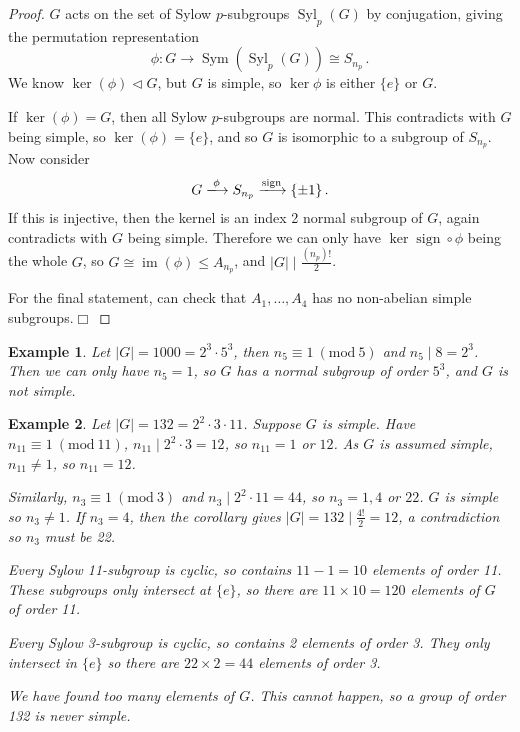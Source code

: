 \documentclass{article}
\theoremstyle{plain}\theoremheaderfont{\normalfont\itshape}\theorembodyfont{\rmfamily}\theoremseparator{.}\newtheorem*{rem}{Remark}\newtheorem*{ex}{Example}\newtheorem*{proof}{Proof}\newtheorem*{altp}{Alternative proof}\newtheorem*{nonex}{Non-Example}
\theoremstyle{plain}\theoremheaderfont{\normalfont\bfseries}\theorembodyfont{\rmfamily}\theoremseparator{.}\newtheorem{thm}{Theorem}[section]\newtheorem{lem}[thm]{Lemma}\newtheorem{prop}[thm]{Proposition}\newtheorem*{cor}{Corollary}\newtheorem{defn}[thm]{Definition}\newtheorem{clm}[thm]{Claim}\newtheorem{clminproof}{Claim}\newtheorem*{notn}{Notation}\newtheorem*{exer}{Exercise}\newtheorem*{lemnn}{Lemma}
\theoremstyle{break}\theoremheaderfont{\normalfont\itshape}\theorembodyfont{\rmfamily}\theoremseparator{.\medskip}\newtheorem*{proofskip}{Proof}\newtheorem*{exs}{Examples}\newtheorem*{rems}{Remarks}\newtheorem*{obs}{Observations}
\theoremstyle{break}\theoremheaderfont{\normalfont\bfseries}\theorembodyfont{\rmfamily}\theoremseparator{.\medskip}\newtheorem{lemskip}[thm]{Lemma}\newtheorem{defnskip}[thm]{Definition}\newtheorem{propskip}[thm]{Proposition}\newtheorem{thmskip}[thm]{Theorem}
\numberwithin{equation}{section}
\newcommand{\qed}{\hfill\ensuremath{\Box}}
\newcommand{\abs}[1]{\left|#1\right|}
\DeclareMathOperator*{\im}{im}
\DeclareMathOperator*{\sign}{sign}
\DeclareMathOperator*{\Sym}{Sym}
\DeclareMathOperator{\Syl}{Syl}
\newcommand{\MOD}[1]{\ (\mathrm{mod} \ #1)}
\begin{document}
    \begin{proof}
        \(G\) acts on the set of Sylow \(p\)-subgroups \(\Syl_p(G)\) by conjugation, giving the permutation representation
        \[\phi:G\to\Sym(\Syl_p(G))\cong S_{n_p}\,.\]
        We know \(\ker(\phi)\lhd G\), but \(G\) is simple, so \(\ker\phi\) is either \(\{e\}\) or \(G\).

        If \(\ker(\phi)=G\), then all Sylow \(p\)-subgroups are normal. This contradicts with \(G\) being simple, so \(\ker(\phi)=\{e\}\), and so \(G\) is isomorphic to a subgroup of \(S_{n_p}\). Now consider
        \[G\xlongrightarrow{\phi}S_{n_p}\xlongrightarrow{\sign}\{\pm 1\}\,.\]
        If this is injective, then the kernel is an index 2 normal subgroup of \(G\), again contradicts with \(G\) being simple. Therefore we can only have \(\ker{\sign\circ\phi}\) being the whole \(G\), so \(G\cong\im(\phi)\le A_{n_p}\), and \(\abs{G}\mid\frac{(n_p)!}{2}\).

        For the final statement, can check that \(A_1,\dots,A_4\) has no non-abelian simple subgroups.\qed
    \end{proof}
    \begin{ex}
        Let \(\abs{G}=1000=2^3\cdot 5^3\), then \(n_5\equiv 1\MOD{5}\) and \(n_5\mid 8=2^3\). Then we can only have \(n_5=1\), so \(G\) has a normal subgroup of order \(5^3\), and \(G\) is not simple.
    \end{ex}
    \begin{ex}
        Let \(\abs{G}=132=2^2\cdot 3\cdot 11\). Suppose \(G\) is simple. Have \(n_11\equiv 1\MOD{11}\), \(n_{11}\mid 2^2\cdot 3=12\), so \(n_{11}=1\) or \(12\). As \(G\) is assumed simple, \(n_{11}\ne 1\), so \(n_{11}=12\).

        Similarly, \(n_3\equiv 1\MOD{3}\) and \(n_3\mid 2^2\cdot 11=44\), so \(n_3=1,4\) or \(22\). \(G\) is simple so \(n_3\ne 1\). If \(n_3=4\), then the corollary gives \(\abs{G}=132\mid\frac{4!}{2}=12\), a contradiction so \(n_3\) must be 22.

        Every Sylow 11-subgroup is cyclic, so contains \(11-1=10\) elements of order 11. These subgroups only intersect at \(\{e\}\), so there are \(11\times 10=120\) elements of \(G\) of order 11.

        Every Sylow 3-subgroup is cyclic, so contains 2 elements of order 3. They only intersect in \(\{e\}\) so there are \(22\times 2=44\) elements of order 3.

        We have found too many elements of \(G\). This cannot happen, so a group of order 132 is never simple.
    \end{ex}
\end{document}
